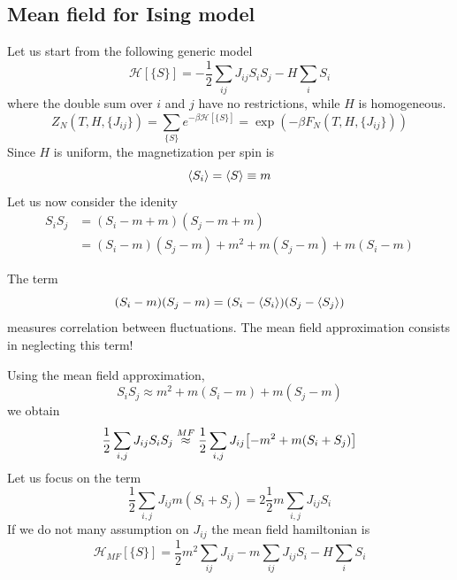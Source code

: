 \documentclass[../main/main.tex]{subfiles}
\begin{document}
\subsection{Mean field for Ising model}
Let us start from the following generic model
\begin{equation}
  \mathcal{H} [\{ S \}  ] =  -\frac{1}{2} \sum_{ij}^{} J_{ij} S_i S_j - H \sum_{i}^{} S_i
\end{equation}
where the double sum over \( i \) and \( j \) have no restrictions, while \( H \) is homogeneous.
\begin{equation}
  Z_N (T,H,\{ J_{ij} \}  )= \sum_{\{ S \}  }^{} e^{-\beta   \mathcal{H} [\{ S \}] } = \exp (-\beta F_N (T,H,\{ J_{ij} \}  ))
\end{equation}
Since \( H \) is uniform, the magnetization per spin is
\begin{equation}
  \expval{S_i}  = \expval{S} \equiv m
\end{equation}
Let us now consider the idenity
\begin{equation}
\begin{split}
  S_i S_j  &= (S_i - m + m) (S_j - m + m)  \\
  & = (S_i - m ) (S_j - m)  + m^2 + m (S_j-m) + m (S_i-m)
\end{split}
\end{equation}
\begin{remark}
The term
\begin{equation*}
  (S_i - m ) (S_j - m) = (S_i - \expval{S_i})(S_j - \expval{S_j})
\end{equation*}
measures correlation between fluctuations. The mean field approximation consists in neglecting this term!
\end{remark}
Using the mean field approximation,
\begin{equation}
  S_i S_j  \approx m^2 + m(S_i-m) + m(S_j-m)
\end{equation}
we obtain
\begin{equation}
  \frac{1}{2} \sum_{i,j}^{} J_{ij}S_i S_j \overset{MF}{\approx } \frac{1}{2} \sum_{i,j }^{} J_{ij} \qty[-m^2+m(S_i+S_j)]
\end{equation}
Let us focus on the term
\begin{equation}
  \frac{1}{2} \sum_{i,j }^{} J_{ij} m (S_i+S_j) = 2 \frac{1}{2} m \sum_{i,j }^{} J_{ij}  S_i
  \label{eq:11_2}
\end{equation}
If we do not many assumption on \( J_{ij} \) the mean field hamiltonian is
\begin{equation}
\mathcal{H}_{MF} [ \{ S \}  ] = \frac{1}{2} m^2 \sum_{ij}^{} J_{ij} - m \sum_{ij}^{} J_{ij} S_i - H \sum_{i}^{} S_i
\end{equation}
\end{document}
